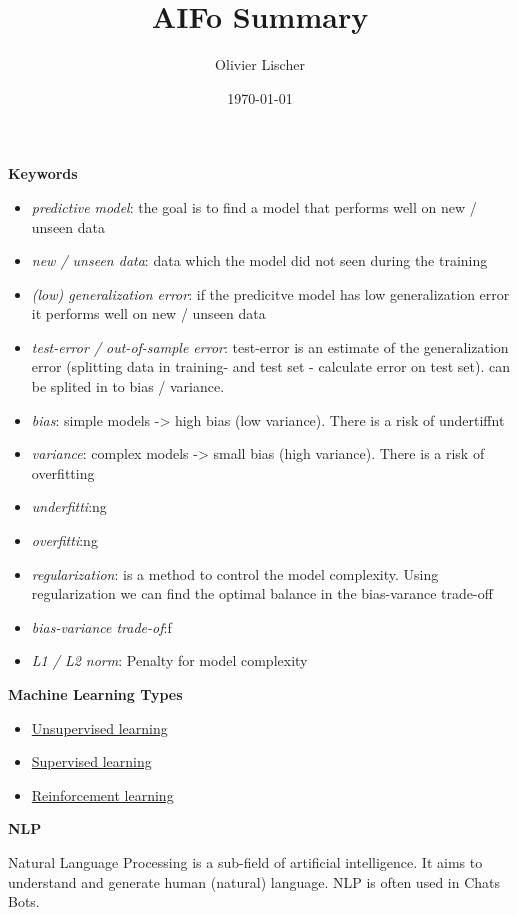 \documentclass[11pt,landscape]{article}
\author{Olivier Lischer}
\date{\today}
\title{AIFo Summary}
\begin{document}
\begin{multicols}{3}

\textbf{Keywords}

\begin{itemize}
\item \emph{predictive model}: the goal is to find a model that performs well on new / unseen data
\item \emph{new / unseen data}: data which the model did not seen during the training
\item \emph{(low) generalization error}: if the predicitve model has low generalization error it performs well on new / unseen data
\item \emph{test-error / out-of-sample error}: test-error is an estimate of the generalization error (splitting data in training- and test set - calculate error on test set). can be splited in to bias / variance.
\item \emph{bias}: simple models -> high bias (low variance). There is a risk of undertiffnt
\item \emph{variance}: complex models -> small bias (high variance). There is a risk of overfitting
\item \emph{underfitti}:ng
\item \emph{overfitti}:ng
\item \emph{regularization}: is a method to control the model complexity. Using regularization we can find the optimal balance in the bias-varance trade-off
\item \emph{bias-variance trade-of}:f
\item \emph{L1 / L2 norm}: Penalty for model complexity
\end{itemize}

\textbf{Machine Learning Types}

\begin{itemize}
\item \href{../../../roam/20210924090800-unsupervised_learning.org}{Unsupervised learning}
\item \href{../../../roam/20210924091334-supervised_learning.org}{Supervised learning}
\item \href{../../../roam/20210924091935-reinforcement_learning.org}{Reinforcement learning}
\end{itemize}

\textbf{NLP}

Natural Language Processing is a sub-field of artificial intelligence.
It aims to understand and generate human (natural) language.
NLP is often used in Chats Bots.


\end{multicols}
\end{document}
